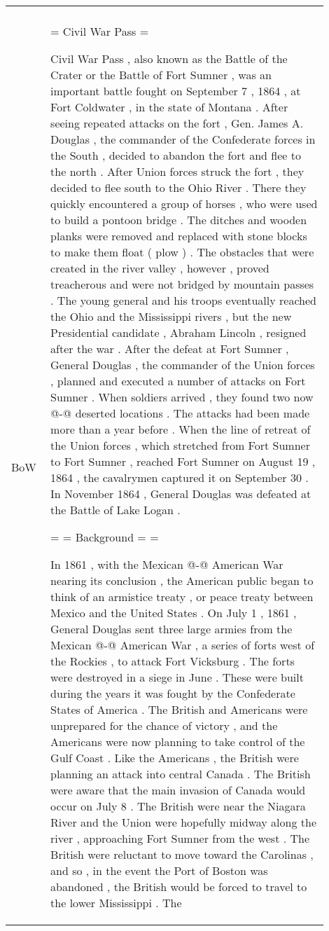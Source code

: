 \documentclass[11pt]{article}
\begin{document}
\begin{table*}[h]
\begin{tabular}{p{0.1\linewidth} | p{0.8\linewidth}}
{ } \\
        \cline{1-2}
        BoW & {\tiny = Civil War Pass = 
 
 Civil War Pass , also known as the Battle of the Crater or the Battle of Fort Sumner , was an important battle fought on September 7 , 1864 , at Fort Coldwater , in the state of Montana . 
 After seeing repeated attacks on the fort , Gen. James A. Douglas , the commander of the Confederate forces in the South , decided to abandon the fort and flee to the north . After Union forces struck the fort , they decided to flee south to the Ohio River . There they quickly encountered a group of horses , who were used to build a pontoon bridge . The ditches and wooden planks were removed and replaced with stone blocks to make them float ( plow ) . The obstacles that were created in the river valley , however , proved treacherous and were not bridged by mountain passes . The young general and his troops eventually reached the Ohio and the Mississippi rivers , but the new Presidential candidate , Abraham Lincoln , resigned after the war . 
 After the defeat at Fort Sumner , General Douglas , the commander of the Union forces , planned and executed a number of attacks on Fort Sumner . When soldiers arrived , they found two now @-@ deserted locations . The attacks had been made more than a year before . When the line of retreat of the Union forces , which stretched from Fort Sumner to Fort Sumner , reached Fort Sumner on August 19 , 1864 , the cavalrymen captured it on September 30 . In November 1864 , General Douglas was defeated at the Battle of Lake Logan .
 
 = = Background = = 
 
 In 1861 , with the Mexican @-@ American War nearing its conclusion , the American public began to think of an armistice treaty , or peace treaty between Mexico and the United States . On July 1 , 1861 , General Douglas sent three large armies from the Mexican @-@ American War , a series of forts west of the Rockies , to attack Fort Vicksburg . The forts were destroyed in a siege in June . These were built during the years it was fought by the Confederate States of America . The British and Americans were unprepared for the chance of victory , and the Americans were now planning to take control of the Gulf Coast . Like the Americans , the British were planning an attack into central Canada . The British were aware that the main invasion of Canada would occur on July 8 . The British were near the Niagara River and the Union were hopefully midway along the river , approaching Fort Sumner from the west . The British were reluctant to move toward the Carolinas , and so , in the event the Port of Boston was abandoned , the British would be forced to travel to the lower Mississippi . 
 The
 
}
\end{tabular}
\end{table*}
\end{document}
